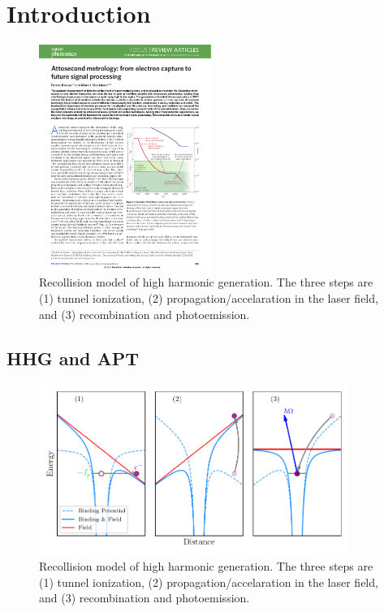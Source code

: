 \chapter{Introduction}
\label{chap:Intro}


\begin{figure}
	\centering
	\includegraphics[width=0.5\textwidth]{figures/Introduction/Pulse_duration.pdf}
	\caption[Recollision model of high harmonic generation]{Recollision model of high harmonic generation.  The three steps are (1) tunnel ionization, (2) propagation/accelaration in the laser field, and (3) recombination and photoemission.}
	\label{fig:pulse_duartion}
\end{figure}

\section{HHG and APT}
\label{intro_HHG}

\begin{figure}
	\centering
	\includegraphics[width=0.9\textwidth]{figures/Introduction/3-step.pdf}
	\caption[Recollision model of high harmonic generation]{Recollision model of high harmonic generation.  The three steps are (1) tunnel ionization, (2) propagation/accelaration in the laser field, and (3) recombination and photoemission.}
	\label{fig:3-step}
\end{figure}

